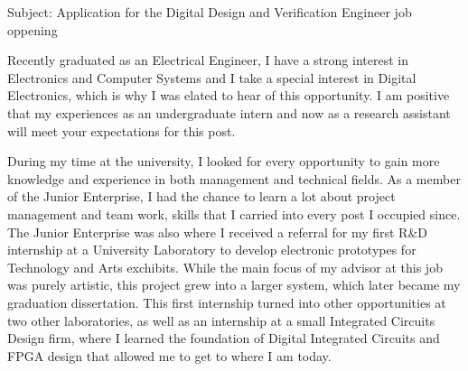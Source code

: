\documentclass[a4paper]{twentysecondcv} %
\begin{document}
\makeprofile %

\vspace{4cm}

 
 \vspace{1cm}
Subject: Application for the Digital Design and Verification Engineer job oppening

Recently graduated as an Electrical Engineer, I have a strong interest in Electronics and Computer Systems and I take a special interest in Digital Electronics, which is why I was elated to hear of this opportunity. I am positive that my experiences as an undergraduate intern and now as a research assistant will meet your expectations for this post.\par

During my time at the university, I looked for every opportunity to gain more knowledge and experience in both management and technical fields. As a member of the Junior Enterprise, I had the chance to learn a lot about project management and team work, skills that I carried into every post I occupied since. The Junior Enterprise was also where I received a referral for my first R\&D internship at a University Laboratory to develop electronic prototypes for Technology and Arts exchibits. While the main focus of my advisor at this job was purely artistic, this project grew into a larger system, which later became my graduation dissertation. This first internship turned into other opportunities at two other laboratories, as well as an internship at a small Integrated Circuits Design firm, where I learned the foundation of Digital Integrated Circuits and FPGA design that allowed me to get to where I am today.\par
\end{document}
